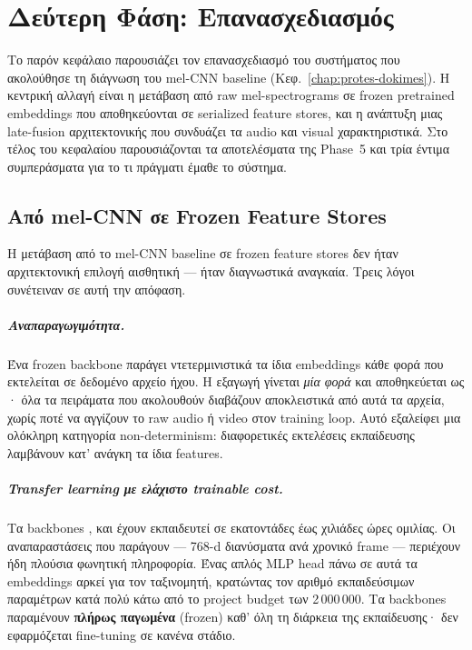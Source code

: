 \chapter{Δεύτερη Φάση: Επανασχεδιασμός}
\label{chap:deyteri-fasi}

Το παρόν κεφάλαιο παρουσιάζει τον επανασχεδιασμό του συστήματος
που ακολούθησε τη διάγνωση του mel-CNN baseline (Κεφ.~\ref{chap:protes-dokimes}).
Η κεντρική αλλαγή είναι η μετάβαση από raw mel-spectrograms
σε frozen pretrained embeddings που αποθηκεύονται σε serialized feature stores,
και η ανάπτυξη μιας late-fusion αρχιτεκτονικής που συνδυάζει
τα audio και visual χαρακτηριστικά.
Στο τέλος του κεφαλαίου παρουσιάζονται τα αποτελέσματα της Phase~5
και τρία έντιμα συμπεράσματα για το τι πράγματι έμαθε το σύστημα.

\section{Από mel-CNN σε Frozen Feature Stores}
\label{sec:mel-to-feature-stores}

Η μετάβαση από το mel-CNN baseline σε frozen feature stores δεν ήταν
αρχιτεκτονική επιλογή αισθητική — ήταν διαγνωστικά αναγκαία.
Τρεις λόγοι συνέτειναν σε αυτή την απόφαση.

\paragraph{Αναπαραγωγιμότητα.}
Ένα frozen backbone παράγει ντετερμινιστικά τα ίδια embeddings
κάθε φορά που εκτελείται σε δεδομένο αρχείο ήχου.
Η εξαγωγή γίνεται \emph{μία φορά} και αποθηκεύεται ως ·
όλα τα πειράματα που ακολουθούν διαβάζουν αποκλειστικά από αυτά τα αρχεία,
χωρίς ποτέ να αγγίζουν το raw audio ή video στον training loop.
Αυτό εξαλείφει μια ολόκληρη κατηγορία non-determinism:
διαφορετικές εκτελέσεις εκπαίδευσης λαμβάνουν κατ' ανάγκη τα ίδια features.

\paragraph{Transfer learning με ελάχιστο trainable cost.}
Τα backbones ,
 και 
έχουν εκπαιδευτεί σε εκατοντάδες έως χιλιάδες ώρες ομιλίας.
Οι αναπαραστάσεις που παράγουν — 768-d διανύσματα ανά χρονικό frame —
περιέχουν ήδη πλούσια φωνητική πληροφορία.
Ένας απλός MLP head πάνω σε αυτά τα embeddings αρκεί για τον ταξινομητή,
κρατώντας τον αριθμό εκπαιδεύσιμων παραμέτρων κατά πολύ κάτω
από το project budget των 2\,000\,000.
Τα backbones παραμένουν \textbf{πλήρως παγωμένα} (frozen) καθ' όλη
τη διάρκεια της εκπαίδευσης· δεν εφαρμόζεται fine-tuning σε κανένα στάδιο.

